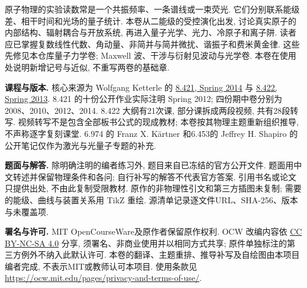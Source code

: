 原子物理的实验读数常是一个共振频率、一条谱线或一束荧光. 它们分别联系能级差、相干时间和光场的量子统计. 本卷从二能级的受控演化出发, 讨论真实原子的内部结构、辐射耦合与开放系统, 再进入量子光学、光力、冷原子和离子阱. 读者应已掌握复数线性代数、角动量、非简并与简并微扰、谐振子和费米黄金律. 这些先修见本仓库量子力学卷; Maxwell 波、干涉与衍射见波动与光学卷. 本卷在使用处说明新增记号与近似, 不重写两卷的基础章.

\textbf{课程与版本.} 核心来源为 Wolfgang Ketterle 的 \href{https://ocw.mit.edu/courses/8-421-atomic-and-optical-physics-i-spring-2014/}{8.421, Spring 2014} 与 \href{https://ocw.mit.edu/courses/8-422-atomic-and-optical-physics-ii-spring-2013/}{8.422, Spring 2013}. 8.421 的十份公开作业实际注明 Spring 2012; 四份期中卷分别为 2008、2010、2012、2014. 8.422 大纲有21次课, 部分课拆成两段视频, 共有28段转写. 视频转写不是包含全部板书公式的现成教材; 本卷按其物理主题重新组织推导, 不声称逐字复刻课堂. 6.974 的 Franz X. Kärtner 和6.453的 Jeffrey H. Shapiro 的公开笔记仅作为激光与光量子专题的补充.

\textbf{题面与解答.} 除明确注明的编者练习外, 题目来自已冻结的官方公开文件. 题面用中文转述并保留物理条件和各问; 自行补写的解答不代表官方答案. 引用书名或论文只提供出处, 不由此复制受限教材. 原作的非物理性引文和第三方插图未复制; 需要的能级、曲线与装置关系用 TikZ 重绘. 源清单记录逐文件URL、SHA-256、版本与未覆盖项.

\textbf{署名与许可.} MIT OpenCourseWare及原作者保留原作权利. OCW 改编内容依 \href{https://creativecommons.org/licenses/by-nc-sa/4.0/}{CC BY-NC-SA 4.0} 分享, 须署名、非商业使用并以相同方式共享; 原件单独标注的第三方例外不纳入此默认许可. 本卷的翻译、主题重排、推导补写及自绘图由本项目编者完成, 不表示MIT或教师认可本项目. 使用条款见 \url{https://ocw.mit.edu/pages/privacy-and-terms-of-use/}.
